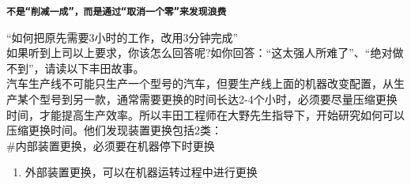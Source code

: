 \textbf{\texttt{不是“削减一成”，而是通过“取消一个零”来发现浪费}}

``如何把原先需要3小时的工作，改用3分钟完成''\\
如果听到上司以上要求，你该怎么回答呢?如你回答：``这太强人所难了''、``绝对做不到''，请读以下丰田故事。\\
汽车生产线不可能只生产一个型号的汽车，但要生产线上面的机器改变配置，从生产某个型号到另一款，通常需要更换的时间长达2-4个小时，必须要尽量压缩更换时间，才能提高生产效率。所以丰田工程师在大野先生指导下，开始研究如何可以压缩更换时间。他们发现装置更换包括2类：\\
\#内部装置更换，必须要在机器停下时更换

\begin{enumerate}
\tightlist
\item
  外部装置更换，可以在机器运转过程中进行更换
\end{enumerate}

